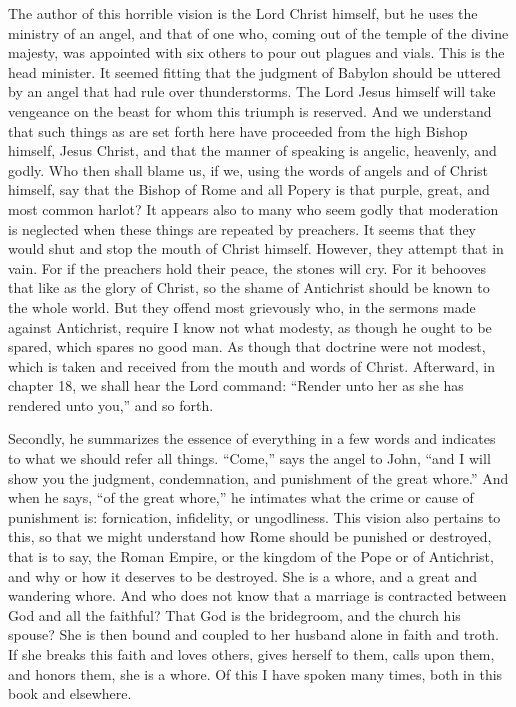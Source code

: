 The author of this horrible vision is the Lord Christ himself, but he uses the ministry of an angel, and that of one who, coming out of the temple of the divine majesty, was appointed with six others to pour out plagues and vials. This is the head minister. It seemed fitting that the judgment of Babylon should be uttered by an angel that had rule over thunderstorms. The Lord Jesus himself will take vengeance on the beast for whom this triumph is reserved. And we understand that such things as are set forth here have proceeded from the high Bishop himself, Jesus Christ, and that the manner of speaking is angelic, heavenly, and godly. Who then shall blame us, if we, using the words of angels and of Christ himself, say that the Bishop of Rome and all Popery is that purple, great, and most common harlot? It appears also to many who seem godly that moderation is neglected when these things are repeated by preachers. It seems that they would shut and stop the mouth of Christ himself. However, they attempt that in vain. For if the preachers hold their peace, the stones will cry. For it behooves that like as the glory of Christ, so the shame of Antichrist should be known to the whole world. But they offend most grievously who, in the sermons made against Antichrist, require I know not what modesty, as though he ought to be spared, which spares no good man. As though that doctrine were not modest, which is taken and received from the mouth and words of Christ. Afterward, in chapter 18, we shall hear the Lord command: “Render unto her as she has rendered unto you,” and so forth.

Secondly, he summarizes the essence of everything in a few words and indicates to what we should refer all things. “Come,” says the angel to John, “and I will show you the judgment, condemnation, and punishment of the great whore.” And when he says, “of the great whore,” he intimates what the crime or cause of punishment is: fornication, infidelity, or ungodliness. This vision also pertains to this, so that we might understand how Rome should be punished or destroyed, that is to say, the Roman Empire, or the kingdom of the Pope or of Antichrist, and why or how it deserves to be destroyed. She is a whore, and a great and wandering whore. And who does not know that a marriage is contracted between God and all the faithful? That God is the bridegroom, and the church his spouse? She is then bound and coupled to her husband alone in faith and troth. If she breaks this faith and loves others, gives herself to them, calls upon them, and honors them, she is a whore. Of this I have spoken many times, both in this book and elsewhere.

